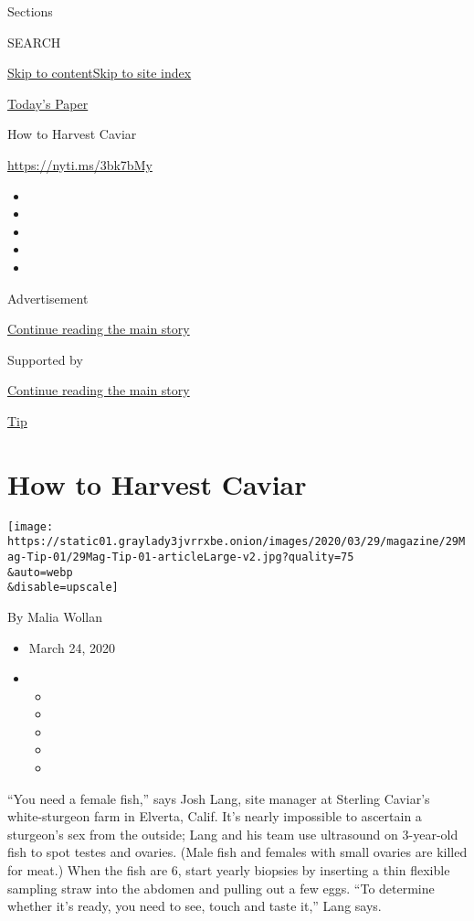 Sections

SEARCH

\protect\hyperlink{site-content}{Skip to
content}\protect\hyperlink{site-index}{Skip to site index}

\href{https://myaccount.nytimes3xbfgragh.onion/auth/login?response_type=cookie\&client_id=vi}{}

\href{https://www.nytimes3xbfgragh.onion/section/todayspaper}{Today's
Paper}

How to Harvest Caviar

\url{https://nyti.ms/3bk7bMy}

\begin{itemize}
\item
\item
\item
\item
\item
\end{itemize}

Advertisement

\protect\hyperlink{after-top}{Continue reading the main story}

Supported by

\protect\hyperlink{after-sponsor}{Continue reading the main story}

\href{/column/magazine-tip}{Tip}

\hypertarget{how-to-harvest-caviar}{%
\section{How to Harvest Caviar}\label{how-to-harvest-caviar}}

\texttt{[image: https://static01.graylady3jvrrxbe.onion/images/2020/03/29/magazine/29Mag-Tip-01/29Mag-Tip-01-articleLarge-v2.jpg?quality=75\\\&auto=webp\\\&disable=upscale]}

By Malia Wollan

\begin{itemize}
\item
  March 24, 2020
\item
  \begin{itemize}
  \item
  \item
  \item
  \item
  \item
  \end{itemize}
\end{itemize}

``You need a female fish,'' says Josh Lang, site manager at Sterling
Caviar's white-sturgeon farm in Elverta, Calif. It's nearly impossible
to ascertain a sturgeon's sex from the outside; Lang and his team use
ultrasound on 3-year-old fish to spot testes and ovaries. (Male fish and
females with small ovaries are killed for meat.) When the fish are 6,
start yearly biopsies by inserting a thin flexible sampling straw into
the abdomen and pulling out a few eggs. ``To determine whether it's
ready, you need to see, touch and taste it,'' Lang says.

